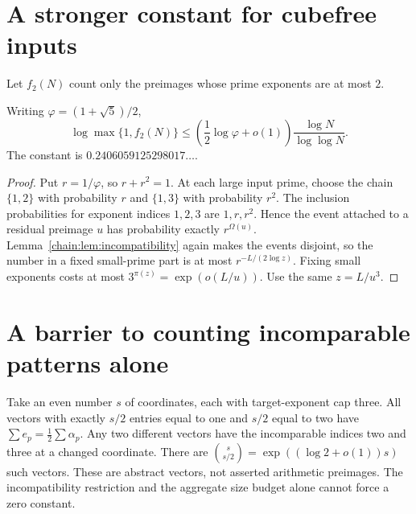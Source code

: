 \section{A stronger constant for cubefree inputs}
Let $f_2(N)$ count only the preimages whose prime exponents are at most $2$.
\begin{corollary}
Writing $\varphi=(1+\sqrt5)/2$,
\[
\boxed{\log\max\{1,f_2(N)\}\le
\left(\frac12\log\varphi+o(1)\right)\frac{\log N}{\log\log N}.}
\]
The constant is $0.2406059125298017\ldots$.
\end{corollary}
\begin{proof}
Put $r=1/\varphi$, so $r+r^2=1$. At each large input prime, choose the chain $\{1,2\}$ with probability $r$ and $\{1,3\}$ with probability $r^2$. The inclusion probabilities for exponent indices $1,2,3$ are $1,r,r^2$. Hence the event attached to a residual preimage $u$ has probability exactly $r^{\Omega(u)}$. Lemma~\ref{chain:lem:incompatibility} again makes the events disjoint, so the number in a fixed small-prime part is at most $r^{-L/(2\log z)}$. Fixing small exponents costs at most $3^{\pi(z)}=\exp(o(L/u))$. Use the same $z=L/u^3$.
\end{proof}


\section{A barrier to counting incomparable patterns alone}
Take an even number $s$ of coordinates, each with target-exponent cap three.
All vectors with exactly $s/2$ entries equal to one and $s/2$ equal to two have
$\sum e_p=\tfrac12\sum\alpha_p$. Any two different vectors have the incomparable
indices two and three at a changed coordinate. There are
$\binom{s}{s/2}=\exp((\log2+o(1))s)$ such vectors. These are abstract vectors,
not asserted arithmetic preimages. The incompatibility restriction and the
aggregate size budget alone cannot force a zero constant.
